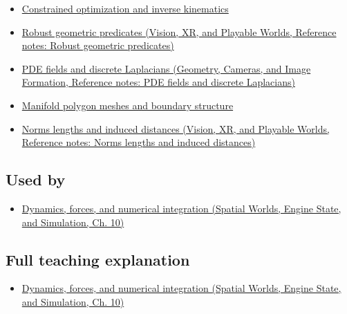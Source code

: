 \hypertarget{appendix-a9ba01fa72a6-prerequisites}{}

\begin{itemize}
\tightlist
\item
  \hyperref[appendix-29f4bea4c2bb]{Constrained optimization and inverse kinematics}
\item
  \href{../07-Vision-XR-and-Playable-Worlds/main.pdf\#nameddest=appendix-341296fb3f64}{Robust geometric predicates (Vision, XR, and Playable Worlds, Reference notes: Robust geometric predicates)}
\item
  \href{../03-Geometry-Cameras-and-Image-Formation/main.pdf\#nameddest=appendix-1988d465c119}{PDE fields and discrete Laplacians (Geometry, Cameras, and Image Formation, Reference notes: PDE fields and discrete Laplacians)}
\item
  \hyperref[appendix-fab348609369]{Manifold polygon meshes and boundary structure}
\item
  \href{../07-Vision-XR-and-Playable-Worlds/main.pdf\#nameddest=appendix-49933872bb51}{Norms lengths and induced distances (Vision, XR, and Playable Worlds, Reference notes: Norms lengths and induced distances)}
\end{itemize}

\subsection{Used by}\label{appendix-a9ba01fa72a6-used-by}

\hypertarget{appendix-a9ba01fa72a6-used-by}{}

\begin{itemize}
\tightlist
\item
  \href{../05-Spatial-Worlds-Engine-State-and-Simulation/main.pdf\#nameddest=04-visual-computing-ii-ch029-dynamics-forces-and-numerical-integration}{Dynamics, forces, and numerical integration (Spatial Worlds, Engine State, and Simulation, Ch. 10)}
\end{itemize}

\subsection{Full teaching explanation}\label{appendix-a9ba01fa72a6-full-teaching-explanation}

\hypertarget{appendix-a9ba01fa72a6-full-teaching-explanation}{}

\begin{itemize}
\tightlist
\item
  \href{../05-Spatial-Worlds-Engine-State-and-Simulation/main.pdf\#nameddest=04-visual-computing-ii-ch029-dynamics-forces-and-numerical-integration}{Dynamics, forces, and numerical integration (Spatial Worlds, Engine State, and Simulation, Ch. 10)}
\end{itemize}

